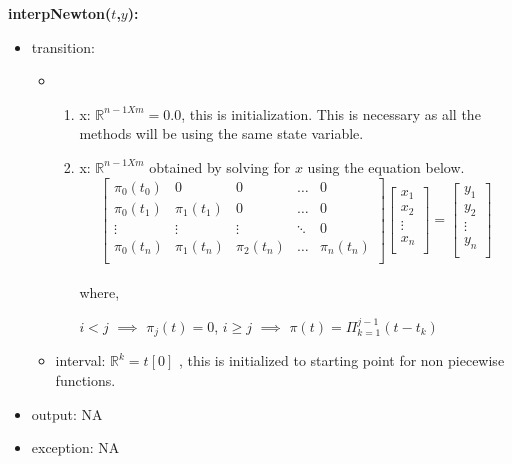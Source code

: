\documentclass[12pt, titlepage]{article}
\begin{document}
\noindent \textbf{interpNewton($t$,$y$):}
\begin{itemize}
	\item transition: 
	\begin{itemize}
		\item 
		\begin{enumerate}
			\item x: $\mathbb{R}^{n-1 X m} = 0.0 $, this is initialization. 
			This is necessary as all the methods will be using the same state 
			variable.
			
			\item x: $\mathbb{R}^{n-1 X m}$ obtained by solving for $x$ using 
			the equation below.
			\begin{equation*}
			\begin{bmatrix}
			\pi_0 (t_0) & 0           & 0            & \dots         & 0 \\
			\pi_0 (t_1) & \pi_1 (t_1) & 0            & \dots         & 0 \\
			\vdots      & \vdots      & \vdots       &\ddots         & 0 \\
			\pi_0 (t_n) & \pi_1 (t_n) & \pi_2 (t_n)  & \dots         & \pi_n 
			(t_n) \\
			\end{bmatrix}
			\begin{bmatrix}
			x_1  \\
			x_2 \\
			\vdots \\
			x_n \\
			\end{bmatrix} = 
			\begin{bmatrix}
			y_1  \\
			y_2 \\
			\vdots \\
			y_n \\
			\end{bmatrix} 
			\end{equation*}\\ 
			
			where,
			
			$i < j$ $\implies$ $\pi_j (t) = 0$, 
			$i \geq j$  $\implies$  $\pi(t) = \Pi_{k=1}^{j-1} (t - t_k)$  
			
		\end{enumerate}
		\item interval: $\mathbb{R}^{k} = t[0] $ , this is initialized to 
		starting point for non piecewise functions.
	\end{itemize}	
	\item output: NA	
\item exception: NA
\end{itemize}
\end{document}
